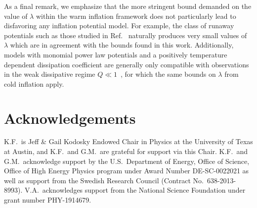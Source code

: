 \documentclass[aps,prd,twocolumn,amssymb,amsmath,floatfix,nofootinbib,superscriptaddress,preprintnumbers]{revtex4-1}
\begin{document}
As a final remark, we emphasize that the more stringent bound demanded on the value of $\lambda$ within the warm inflation framework does not particularly lead to disfavoring any inflation potential model. For example, the class of runaway potentials such as those studied in Ref.~\cite{Das:2020xmh} naturally produces very small values of $\lambda$ which are in agreement with the bounds found in this work. Additionally, models with monomial power law potentials and a positively temperature dependent dissipation coefficient are generally only compatible with observations in the weak dissipative regime $Q \ll 1$~\cite{Benetti:2016jhf}, for which the same bounds on $\lambda$ from cold inflation apply.

\section*{Acknowledgements}

K.F.\ is Jeff \& Gail Kodosky Endowed Chair in Physics at the University of Texas at Austin, and K.F.\ and G.M.\ are grateful for support via this Chair. K.F.\ and G.M.\ acknowledge support by the U.S.\ Department of Energy, Office of Science, Office of High Energy Physics program under Award Number DE-SC-0022021 as well as support from the Swedish Research Council (Contract No.~638-2013-8993). V.A.\ acknowledges support from the National Science Foundation under grant number PHY-1914679.



\end{document}
